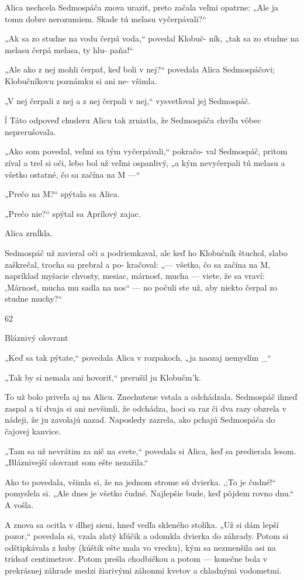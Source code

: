 \documentclass[12pt]{article}
\begin{document}
\begin{Parallel}[p]{}{}
{{Alica nechcela Sedmospáča znova uraziť, preto začala
veľmi opatrne: „Ale ja tomu dobre nerozumiem. Skade tú
melasu vyčerpávali?“

„Ak sa zo studne na vodu čerpá voda,“ povedal Klobuč-
ník, „tak sa zo studne na melasu čerpá melasa, ty hlu-
paňa!“

„Ale ako z nej mohli čerpať, keď boli v nej?“ povedala
Alica Sedmospáčovi; Klobučníkovu poznámku si ani ne-
všimla.

„V nej čerpali z nej a z nej čerpali v nej,“ vysvetľoval jej
Sedmospáč.

ĺ Táto odpoveď chuderu Alicu tak zrniatla, že Sedmospáča
chvíľu vôbec neprerušovala.

„Ako som povedal, veľmi sa tým vyčerpávali,“ pokračo-
val Sedmospáč, pritom zíval a trel si oči, lebo bol už veľmi
ospanlivý, „a kým nevyčerpali tú melasu a všetko ostatné, čo
sa začína na M —“

„Prečo na M?“ spýtala sa Alica.

„Prečo nie?“ spýtal sa Aprílový zajac.

Alica zrnĺkla.

Sedmospáč už zavieral oči a podriemkaval, ale keď ho
Klobučník štuchol, slabo zaškrečal, trocha sa prebral a po-
kračoval: „— všetko, čo sa začína na M, napríklad myšacie
chvosty, mesiac, márnosť, mucha — viete, že sa vraví:
,Márnosť, mucha mu sadla na nos“ — no počuli ste už, aby
niekto čerpal zo studne muchy?“

62

Bláznivý olovrant

„Keď sa tak pýtate,“ povedala Alica v rozpakoch, „ja
naozaj nemyslím _“

„Tak by si nemala ani hovoriť,“ prerušil ju Klobučm'k.

To už bolo priveľa aj na Alicu. Znechutene vstala
a odchádzala. Sedmospáč ihneď zaspal a tí dvaja si ani
nevšimli, že odchádza, hoci sa raz či dva razy obzrela
v nádeji, že ju zavolajú nazad. Naposledy zazrela, ako
pchajú Sedmospáča do čajovej kanvice.

„Tam sa už nevrátim za nič na svete,“ povedala si Alica,
keď sa predierala lesom. „Bláznivejší olovrant som ešte
nezažila.“

Ako to povedala, všimla si, že na jednom strome sú
dvierka. ,;To je čudné!“ pomyslela si. „Ale dnes je všetko
čudné. Najlepšie bude, keď pôjdem rovno dnu.“ A vošla.

A znova sa ocitla v dlhej sieni, hneď vedľa skleného
stolíka. „Už si dám lepší pozor,“ povedala si, vzala zlatý
kľúčik a odomkla dvierka do záhrady. Potom si odštipkávala
z huby (kúštik ešte mala vo vrecku), kým sa nezmenšila asi
na tridsať centimetrov. Potom prešla chodbičkou a potom
— konečne bola v prekrásnej záhrade medzi žiarivými
záhonmi kvetov a chladnými vodometmi.

}}
\end{Parallel}
\end{document}
